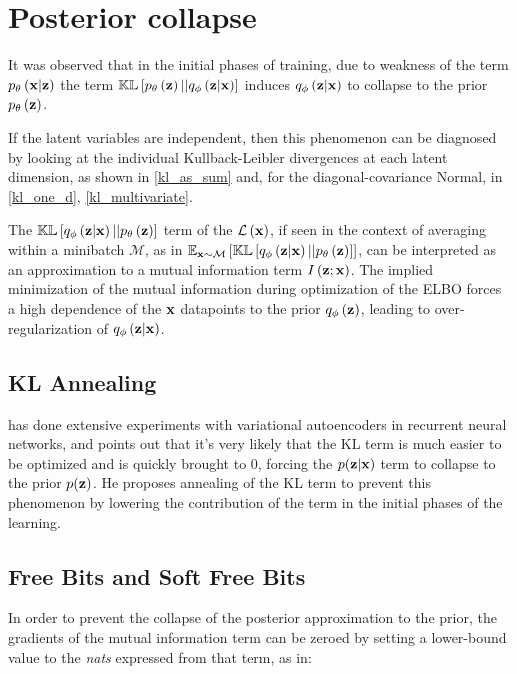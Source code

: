 \section{Posterior collapse}
\label{posterior_collapse}

It was observed\cite{Kingma2017}\cite{1611.02731} that in the initial phases of training, due to weakness of the term $p_\theta\left(\mathbf{x}|\mathbf{z}\right)$ the term $\mathbb{KL}\left[ p_\theta\left(\mathbf{z}\right) || q_\phi\left(\mathbf{z}|\mathbf{x}\right) \right]$ 
induces $q_\phi\left(\mathbf{z}|\mathbf{x}\right)$ to collapse to the prior $p_\theta\left(\mathbf{z}\right)$.

If the latent variables are independent, then this phenomenon can be diagnosed by looking at the individual Kullback-Leibler divergences
at each latent dimension, as shown in \ref{kl_as_sum} and, for the diagonal-covariance Normal, in \ref{kl_one_d}, \ref{kl_multivariate}.

 The $\mathbb{KL}\left[ q_\phi\left(\mathbf{z}|\mathbf{x}\right) || p_\theta\left(\mathbf{z}\right) \right]$ term of the $\mathcal{L}\left(\mathbf{x}\right)$, if seen in the context of averaging within a minibatch $\mathcal{M}$, as in
 $\mathbb{E}_{\mathbf{x}\sim\mathcal{M}}\left[ \mathbb{KL}\left[ q_\phi\left(\mathbf{z}|\mathbf{x}\right) || p_\theta\left(\mathbf{z}\right) \right] \right]$,
 can be interpreted as an approximation to a mutual information term $I\left( \mathbf{z} ; \mathbf{x} \right)$.
 The implied minimization of the mutual information during optimization of the ELBO forces a high dependence of the $\mathbf{x}$ datapoints to the prior $q_\phi\left(\mathbf{z}\right)$,
 leading to over-regularization of $q_\phi\left(\mathbf{z}|\mathbf{x}\right)$.

\subsection{KL Annealing}

\cite{Bowman} has done extensive experiments with variational autoencoders
in recurrent neural networks, and points out that it's very likely
that the KL term is much easier to be optimized
and is quickly brought to 0, forcing the $p(\mathbf{z}|\mathbf{x})$ term to
collapse to the prior $p(\mathbf{z})$.
He proposes annealing of the KL term to prevent this phenomenon by
lowering the contribution of the term in the initial phases of the learning.

\subsection{Free Bits and Soft Free Bits}
 In order to prevent the collapse of the posterior approximation to the prior, the gradients of the mutual information term can be zeroed by setting a lower-bound
 value to the \emph{nats} expressed from that term, as in:
\begin{nalign}
     \max\left[\lambda,\expectxM{\kl{\qzcond}{\pzonly}}\right]
\end{nalign}


